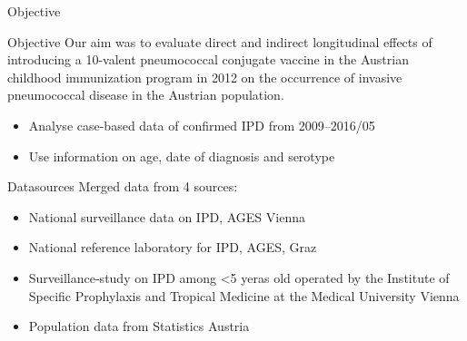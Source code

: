 \documentclass{beamer}\usepackage[]{graphicx}\usepackage[]{color}
\begin{document}
\begin{frame}[fragile]{Objective}
\begin{block}{Objective}
  Our aim was to evaluate direct and indirect longitudinal effects of introducing a 10-valent pneumococcal conjugate vaccine in the Austrian childhood immunization program in 2012 on the occurrence of invasive pneumococcal disease in the Austrian population.
\end{block}
\begin{center}
\begin{itemize}
  \item Analyse case-based data of confirmed IPD from 2009--2016/05
  \item Use information on age, date of diagnosis and serotype
\end{itemize}
\end{center}
\end{frame}


\begin{frame}[fragile]{Datasources}
Merged data from 4 sources:
\begin{center}
\begin{itemize}
  \item National surveillance data on IPD, AGES Vienna
  \item National reference laboratory for IPD, AGES, Graz
  \item Surveillance-study on IPD among <5 yeras old operated by the Institute of Specific Prophylaxis and Tropical Medicine at the Medical University Vienna%
  \item Population data from Statistics Austria
\end{itemize}
\end{center}
\end{frame}
\end{document}
